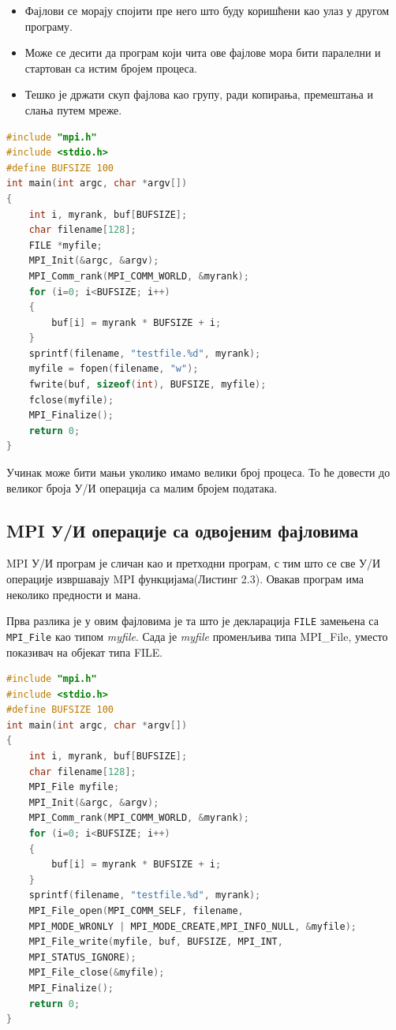 \begin{itemize}
\item Фајлови се морају спојити пре него што буду коришћени као улаз у другом програму.
\item Може се десити да програм који чита ове фајлове мора бити паралелни и стартован са истим бројем процеса.
\item Тешко је држати скуп фајлова као групу, ради копирања, премештања и слања путем мреже.

\end{itemize}

\begin{lstlisting}[style=nonumbers,frame=single,language=C,caption= MPI програм без MPI улазно/излазних операција]
#include "mpi.h"
#include <stdio.h>
#define BUFSIZE 100
int main(int argc, char *argv[])
{
	int i, myrank, buf[BUFSIZE];
	char filename[128];
	FILE *myfile;
	MPI_Init(&argc, &argv);
	MPI_Comm_rank(MPI_COMM_WORLD, &myrank);
	for (i=0; i<BUFSIZE; i++)
	{
		buf[i] = myrank * BUFSIZE + i;
	}
	sprintf(filename, "testfile.%d", myrank);
	myfile = fopen(filename, "w");
	fwrite(buf, sizeof(int), BUFSIZE, myfile);
	fclose(myfile);
	MPI_Finalize();
	return 0;
}
\end{lstlisting}


Учинак може бити мањи уколико имамо велики број процеса. То ће довести до великог броја У/И операција са малим бројем података. 

\subsection{MPI У/И операције са одвојеним фајловима}
MPI У/И програм је сличан као и претходни програм, с тим што се све У/И операције извршавају MPI функцијама(Листинг 2.3). Овакав програм има неколико предности и мана.
 
Прва разлика је у овим фајловима је та што је декларација \texttt{FILE} замењена са \texttt{MPI\_File} као типом \textit{myfile}. Сада је \textit{myfile} променљива типа MPI\_File, уместо показивач на објекат типа FILE.

\begin{lstlisting}[style=nonumbers,frame=single,language=C, caption= MPI програм са одвојеним фајловима]
#include "mpi.h"
#include <stdio.h>
#define BUFSIZE 100
int main(int argc, char *argv[])
{
	int i, myrank, buf[BUFSIZE];
	char filename[128];
	MPI_File myfile;
	MPI_Init(&argc, &argv);
	MPI_Comm_rank(MPI_COMM_WORLD, &myrank);
	for (i=0; i<BUFSIZE; i++)
	{
		buf[i] = myrank * BUFSIZE + i;
	}
	sprintf(filename, "testfile.%d", myrank);
	MPI_File_open(MPI_COMM_SELF, filename,
	MPI_MODE_WRONLY | MPI_MODE_CREATE,MPI_INFO_NULL, &myfile);
	MPI_File_write(myfile, buf, BUFSIZE, MPI_INT,
	MPI_STATUS_IGNORE);
	MPI_File_close(&myfile);
	MPI_Finalize();
	return 0;
}
\end{lstlisting}


